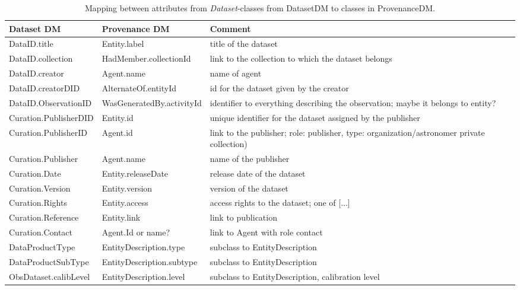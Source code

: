 \documentclass[11pt,a4paper]{ivoa}
\newcommand{\head}[1]{\textbf{#1}}
\newcommand{\class}[1]{\emph{#1}}
\begin{document}
\begin{table}[h]
\small
{}\textwidth
\begin{tabulary}{1.0\textwidth}{@{}lLp{4cm}@{}}
\toprule
\head{Dataset DM} & \head{Provenance DM} & \head{Comment}\\
\midrule
DataID.title      & Entity.label               & title of the dataset\\
DataID.collection    & HadMember.collectionId  & link to the collection to which the dataset belongs\\
DataID.creator       & Agent.name          & name of agent\\ 
DataID.creatorDID    & AlternateOf.entityId     & id for the dataset given by the creator\\
DataID.ObservationID & WasGeneratedBy.activityId  & identifier to everything describing the observation; maybe it belongs to entity?\\
Curation.PublisherDID  & Entity.id      & unique identifier for the dataset assigned by the publisher\\
Curation.PublisherID & Agent.id  & link to the publisher; role: publisher, type: organization/astronomer private collection)\\
Curation.Publisher     & Agent.name & name of the publisher\\
Curation.Date          & Entity.releaseDate & release date of the dataset\\
Curation.Version       & Entity.version     & version of the dataset\\
Curation.Rights        & Entity.access      & access rights to the dataset; one of [...]\\
Curation.Reference     & Entity.link        & link to publication\\
Curation.Contact       & Agent.Id or name? & link to Agent with role contact\\
DataProductType  & EntityDescription.type & subclass to EntityDescription\\
DataProductSubType & EntityDescription.subtype & subclass to EntityDescription\\
ObsDataset.calibLevel       & EntityDescription.level & subclass to EntityDescription, calibration level\\\hline
\bottomrule
\end{tabulary}
\caption{Mapping between attributes from \class{Dataset}-classes from DatasetDM to classes in ProvenanceDM.}
\label{tab:datasetmapping}
\end{table}
\end{document}
